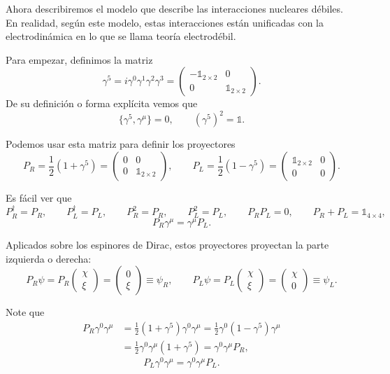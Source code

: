 \documentclass[11pt,a4paper]{article}
\begin{document}
Ahora describiremos el modelo que describe las interacciones nucleares débiles.
En realidad, según este modelo, estas interacciones están unificadas con la
electrodinámica en lo que se llama teoría electrodébil.

Para empezar, definimos la matriz
\[
  \gamma^5=i\gamma^0\gamma^1\gamma^2\gamma^3
  =\begin{pmatrix}
    -\mathbb 1_{2\times2}&0\\
    0&\mathbb 1_{2\times2}
  \end{pmatrix}.
\]
De su definición o forma explícita vemos que
\[
  \{\gamma^5,\gamma^\mu\}=0,\qquad(\gamma^5)^2=\mathbb1.
\]

Podemos usar esta matriz para definir los proyectores
\[
  P_R=\frac12(1+\gamma^5)
  =\begin{pmatrix}0&0\\0&\mathbb1_{2\times2}\end{pmatrix},
  \qquad
  P_L=\frac12(1-\gamma^5)
  =\begin{pmatrix}\mathbb1_{2\times2}&0\\0&0\end{pmatrix}.
\]

Es fácil ver que
\[
  P_R^\dagger=P_R,
  \qquad
  P_L^\dagger=P_L,
  \qquad
  P_R^2=P_R,
  \qquad
  P_L^2=P_L,
  \qquad
  P_RP_L=0,
  \qquad
  P_R+P_L=\mathbb 1_{4\times4},
\]
\[
  P_R\gamma^\mu=\gamma^\mu P_L.
\]

Aplicados sobre los espinores de Dirac, estos proyectores proyectan la parte
izquierda o derecha:
\[
  P_R\psi=P_R\begin{pmatrix}\chi\\\xi\end{pmatrix}
  =\begin{pmatrix}0\\\xi\end{pmatrix}\equiv\psi_R,
  \qquad
  P_L\psi=P_L\begin{pmatrix}\chi\\\xi\end{pmatrix}
  =\begin{pmatrix}\chi\\0\end{pmatrix}\equiv\psi_L.
\]

Note que
\begin{align*}
  P_R\gamma^0\gamma^\mu
  &=\frac12(1+\gamma^5)\gamma^0\gamma^\mu
   =\frac12\gamma^0(1-\gamma^5)\gamma^\mu\\
  &=\frac12\gamma^0\gamma^\mu(1+\gamma^5)
   =\gamma^0\gamma^\mu P_R,
\end{align*}
\[
  P_L\gamma^0\gamma^\mu=\gamma^0\gamma^\mu P_L.
\]
\end{document}
